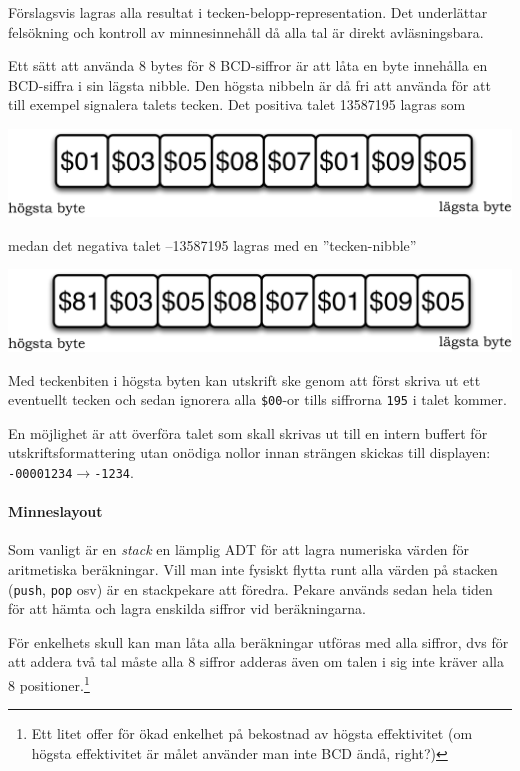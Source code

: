 \documentclass[oneside,10pt,a4paper,swedish]{scrbook}
\newcommand{\asm}[1]{\texttt{#1}}
\begin{document}
Förslagsvis lagras alla resultat i tecken-belopp-representation. Det underlättar felsökning och kontroll av minnesinnehåll då alla tal är direkt avläsningsbara. 

Ett sätt att använda 8 bytes för 8 BCD-siffror är att låta en byte innehålla en BCD-siffra i sin lägsta nibble. Den högsta nibbeln är då fri att använda för att till exempel signalera talets tecken. Det positiva talet 13587195 lagras som

\begin{center}
\includegraphics[scale = 0.4]{bcdformat1.pdf}
\end{center}

medan det negativa talet --13587195 lagras med en ''tecken-nibble''

\begin{center}
\includegraphics[scale = 0.4]{bcdformat2.pdf}
\end{center}

Med teckenbiten i högsta byten kan utskrift ske genom att först skriva ut ett eventuellt tecken och sedan ignorera alla \asm{\$00}-or tills siffrorna \asm{195} i talet kommer.

En möjlighet är att överföra talet som skall skrivas ut till en intern buffert för utskriftsformattering utan onödiga nollor innan strängen skickas till displayen: \asm{-00001234}$\rightarrow$\asm{-1234}.

\paragraph{Minneslayout}
Som vanligt är en \emph{stack} en lämplig ADT för att lagra numeriska värden för aritmetiska beräkningar. Vill man inte fysiskt flytta runt alla värden på stacken (\asm{push}, \asm{pop} osv) är en stackpekare att föredra. Pekare används sedan hela tiden för att hämta och lagra enskilda siffror vid beräkningarna. 

För enkelhets skull kan man låta alla beräkningar utföras med alla siffror, dvs för att addera två tal måste alla 8 siffror adderas även om talen i sig inte kräver alla 8 positioner.\footnote{Ett litet offer för ökad enkelhet på bekostnad av högsta effektivitet (om högsta effektivitet är  målet använder man inte BCD ändå, right?)}
\end{document}
